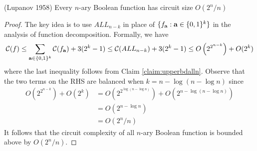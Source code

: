 \documentclass[11pt]{article}
\begin{document}
\begin{theorem}
	\label{thm:lupanov1958-circuitsizeupperbd}
	(Lupanov 1958) Every $n$-ary Boolean function has circuit size $O(2^n/n)$
\end{theorem}
\begin{proof}
	The key idea is to use $ALL_{n-k}$ in place of $\{f_{\mathbf{a}}: \mathbf{a} \in \{0,1\}^k\}$ in the analysis of function decomposition. Formally, we have 
	\[\operatorname*{\mathcal{C}}(f) \leq \sum_{\mathbf{a} \in \{0,1\}^k}\operatorname*{\mathcal{C}}(f_{\mathbf{a}}) + 3(2^k - 1) \leq \operatorname*{\mathcal{C}}(ALL_{n-k}) + 3(2^k - 1) \leq O\left(2^{2^{n-k}}\right) + O(2^k)\]
	where the last inequality follows from Claim \ref{claim:upperbdalln}. Observe that the two terms on the RHS are balanced when $k = n - \log(n - \log n)$ since
	\begin{align*}
		 O\left(2^{2^{n-k}}\right) + O\left(2^k\right) &= O\left(2^{2^{\log(n - \log n)}}\right) + O\left(2^{n - \log(n - \log n)}\right)\\
		 &= O\left(2^{n - \log n}\right)\\
		 &= O\left(2^n/n\right)
	\end{align*}
	It follows that the circuit complexity of all $n$-ary Boolean function is bounded above by $O(2^n/n)$.
\end{proof}
\end{document}
